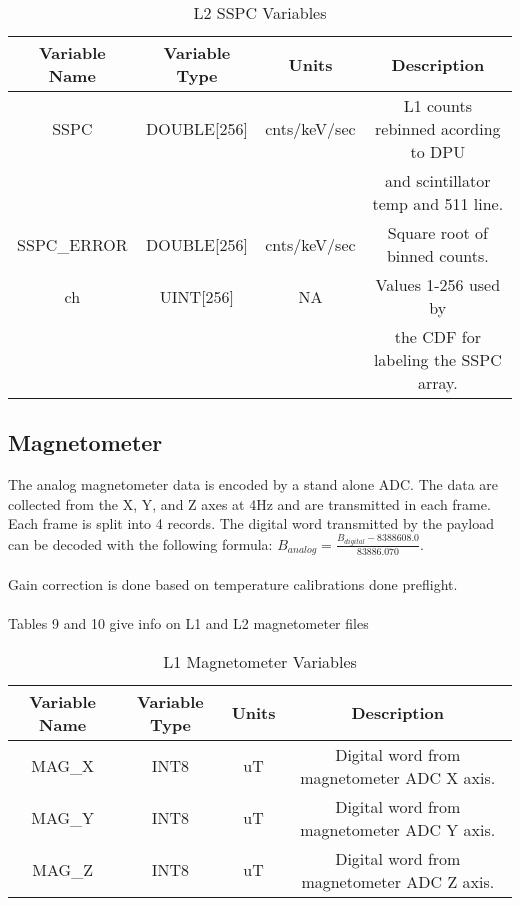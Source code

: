 \documentclass{article}
\begin{document}
\begin{table}[H]
\caption{L2 SSPC Variables}
\begin{tabular}{|c|c|c|c|}
\hline
Variable Name&Variable Type&Units&Description\\ \hline
SSPC&DOUBLE[256]&cnts/keV/sec&L1 counts rebinned acording to DPU\\
~&~&~&and scintillator temp and 511 line.\\ 
SSPC\_ERROR&DOUBLE[256]&cnts/keV/sec&Square root of binned counts.\\ 
ch&UINT[256]&NA&Values 1-256 used by\\
~&~&~&the CDF for labeling the SSPC array.\\
\hline
\end{tabular}
\end{table}

\subsection{Magnetometer}
The analog magnetometer data is encoded by a stand alone ADC. The data are collected from the X, Y, and Z axes at 4Hz and are transmitted in each frame. Each frame is split into 4 records. The digital word transmitted by the payload can be decoded with the following formula: $B_{analog} = \frac{B_{digital} - 8388608.0}{83886.070}$.\\\\
Gain correction is done based on temperature calibrations done preflight.\\\\
Tables 9 and 10 give info on L1 and L2 magnetometer files

\begin{table}[H]
\caption{L1 Magnetometer Variables}
\begin{tabular}{|c|c|c|c|}
\hline
Variable Name&Variable Type&Units&Description\\ \hline
MAG\_X&INT8&uT&Digital word from magnetometer ADC X axis.\\ 
MAG\_Y&INT8&uT&Digital word from magnetometer ADC Y axis.\\ 
MAG\_Z&INT8&uT&Digital word from magnetometer ADC Z axis.\\ 
\hline
\end{tabular}
\end{table}
\end{document}
